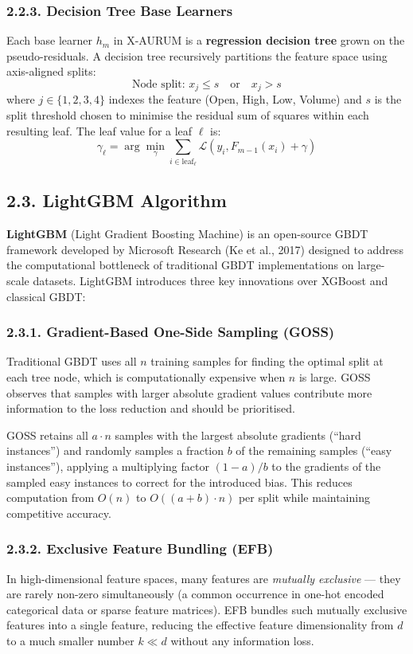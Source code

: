 \subsubsection{2.2.3. Decision Tree Base Learners}
Each base learner $h_m$ in X-AURUM is a \textbf{regression decision tree} grown on the pseudo-residuals. A decision tree recursively partitions the feature space using axis-aligned splits:
\[
\text{Node split: } x_j \leq s \quad \text{or} \quad x_j > s
\]
where $j \in \{1, 2, 3, 4\}$ indexes the feature (Open, High, Low, Volume) and $s$ is the split threshold chosen to minimise the residual sum of squares within each resulting leaf. The leaf value for a leaf $\ell$ is:
\[
\gamma_\ell = \arg\min_\gamma \sum_{i \in \text{leaf}_\ell} \mathcal{L}(y_i, F_{m-1}(x_i) + \gamma)
\]

\subsection{2.3. LightGBM Algorithm}

\textbf{LightGBM} (Light Gradient Boosting Machine) is an open-source GBDT framework developed by Microsoft Research (Ke et al., 2017) designed to address the computational bottleneck of traditional GBDT implementations on large-scale datasets. LightGBM introduces three key innovations over XGBoost and classical GBDT:

\subsubsection{2.3.1. Gradient-Based One-Side Sampling (GOSS)}
Traditional GBDT uses all $n$ training samples for finding the optimal split at each tree node, which is computationally expensive when $n$ is large. GOSS observes that samples with larger absolute gradient values contribute more information to the loss reduction and should be prioritised.

GOSS retains all $a \cdot n$ samples with the largest absolute gradients (``hard instances'') and randomly samples a fraction $b$ of the remaining samples (``easy instances''), applying a multiplying factor $(1-a)/b$ to the gradients of the sampled easy instances to correct for the introduced bias. This reduces computation from $O(n)$ to $O((a+b) \cdot n)$ per split while maintaining competitive accuracy.

\subsubsection{2.3.2. Exclusive Feature Bundling (EFB)}
In high-dimensional feature spaces, many features are \textit{mutually exclusive} --- they are rarely non-zero simultaneously (a common occurrence in one-hot encoded categorical data or sparse feature matrices). EFB bundles such mutually exclusive features into a single feature, reducing the effective feature dimensionality from $d$ to a much smaller number $k \ll d$ without any information loss.

